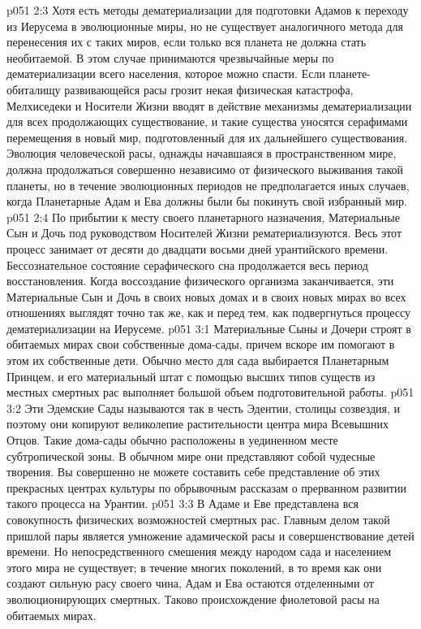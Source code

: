 \vs p051 2:3 \pc Хотя есть методы дематериализации для подготовки Адамов к переходу из Иерусема в эволюционные миры, но не существует аналогичного метода для перенесения их с таких миров, если только вся планета не должна стать необитаемой. В этом случае принимаются чрезвычайные меры по дематериализации всего населения, которое можно спасти. Если планете\hyp{}обиталищу развивающейся расы грозит некая физическая катастрофа, Мелхиседеки и Носители Жизни вводят в действие механизмы дематериализации для всех продолжающих существование, и такие существа уносятся серафимами перемещения в новый мир, подготовленный для их дальнейшего существования. Эволюция человеческой расы, однажды начавшаяся в пространственном мире, должна продолжаться совершенно независимо от физического выживания такой планеты, но в течение эволюционных периодов не предполагается иных случаев, когда Планетарные Адам и Ева должны были бы покинуть свой избранный мир.
\vs p051 2:4 \pc По прибытии к месту своего планетарного назначения, Материальные Сын и Дочь под руководством Носителей Жизни рематериализуются. Весь этот процесс занимает от десяти до двадцати восьми дней урантийского времени. Бессознательное состояние серафического сна продолжается весь период восстановления. Когда воссоздание физического организма заканчивается, эти Материальные Сын и Дочь в своих новых домах и в своих новых мирах во всех отношениях выглядят точно так же, как и перед тем, как подвергнуться процессу дематериализации на Иерусеме.
\vs p051 3:1 Материальные Сыны и Дочери строят в обитаемых мирах свои собственные дома\hyp{}сады, причем вскоре им помогают в этом их собственные дети. Обычно место для сада выбирается Планетарным Принцем, и его материальный штат с помощью высших типов существ из местных смертных рас выполняет большой объем подготовительной работы.
\vs p051 3:2 Эти Эдемские Сады называются так в честь Эдентии, столицы созвездия, и поэтому они копируют великолепие растительности центра мира Всевышних Отцов. Такие дома\hyp{}сады обычно расположены в уединенном месте субтропической зоны. В обычном мире они представляют собой чудесные творения. Вы совершенно не можете составить себе представление об этих прекрасных центрах культуры по обрывочным рассказам о прерванном развитии такого процесса на Урантии.
\vs p051 3:3 \pc В Адаме и Еве представлена вся совокупность физических возможностей смертных рас. Главным делом такой пришлой пары является умножение адамической расы и совершенствование детей времени. Но непосредственного смешения между народом сада и населением этого мира не существует; в течение многих поколений, в то время как они создают сильную расу своего чина, Адам и Ева остаются отделенными от эволюционирующих смертных. Таково происхождение фиолетовой расы на обитаемых мирах.
